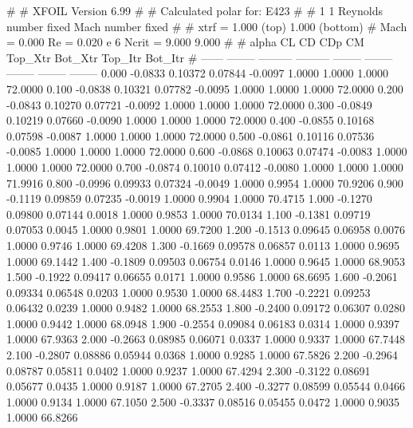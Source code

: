 #  
#       XFOIL         Version 6.99
#  
# Calculated polar for: E423                                            
#  
# 1 1 Reynolds number fixed          Mach number fixed         
#  
# xtrf =   1.000 (top)        1.000 (bottom)  
# Mach =   0.000     Re =     0.020 e 6     Ncrit =   9.000  9.000
#  
#   alpha    CL        CD       CDp       CM     Top_Xtr  Bot_Xtr  Top_Itr  Bot_Itr
#  ------ -------- --------- --------- -------- -------- -------- -------- --------
   0.000  -0.0833   0.10372   0.07844  -0.0097   1.0000   1.0000   1.0000  72.0000
   0.100  -0.0838   0.10321   0.07782  -0.0095   1.0000   1.0000   1.0000  72.0000
   0.200  -0.0843   0.10270   0.07721  -0.0092   1.0000   1.0000   1.0000  72.0000
   0.300  -0.0849   0.10219   0.07660  -0.0090   1.0000   1.0000   1.0000  72.0000
   0.400  -0.0855   0.10168   0.07598  -0.0087   1.0000   1.0000   1.0000  72.0000
   0.500  -0.0861   0.10116   0.07536  -0.0085   1.0000   1.0000   1.0000  72.0000
   0.600  -0.0868   0.10063   0.07474  -0.0083   1.0000   1.0000   1.0000  72.0000
   0.700  -0.0874   0.10010   0.07412  -0.0080   1.0000   1.0000   1.0000  71.9916
   0.800  -0.0996   0.09933   0.07324  -0.0049   1.0000   0.9954   1.0000  70.9206
   0.900  -0.1119   0.09859   0.07235  -0.0019   1.0000   0.9904   1.0000  70.4715
   1.000  -0.1270   0.09800   0.07144   0.0018   1.0000   0.9853   1.0000  70.0134
   1.100  -0.1381   0.09719   0.07053   0.0045   1.0000   0.9801   1.0000  69.7200
   1.200  -0.1513   0.09645   0.06958   0.0076   1.0000   0.9746   1.0000  69.4208
   1.300  -0.1669   0.09578   0.06857   0.0113   1.0000   0.9695   1.0000  69.1442
   1.400  -0.1809   0.09503   0.06754   0.0146   1.0000   0.9645   1.0000  68.9053
   1.500  -0.1922   0.09417   0.06655   0.0171   1.0000   0.9586   1.0000  68.6695
   1.600  -0.2061   0.09334   0.06548   0.0203   1.0000   0.9530   1.0000  68.4483
   1.700  -0.2221   0.09253   0.06432   0.0239   1.0000   0.9482   1.0000  68.2553
   1.800  -0.2400   0.09172   0.06307   0.0280   1.0000   0.9442   1.0000  68.0948
   1.900  -0.2554   0.09084   0.06183   0.0314   1.0000   0.9397   1.0000  67.9363
   2.000  -0.2663   0.08985   0.06071   0.0337   1.0000   0.9337   1.0000  67.7448
   2.100  -0.2807   0.08886   0.05944   0.0368   1.0000   0.9285   1.0000  67.5826
   2.200  -0.2964   0.08787   0.05811   0.0402   1.0000   0.9237   1.0000  67.4294
   2.300  -0.3122   0.08691   0.05677   0.0435   1.0000   0.9187   1.0000  67.2705
   2.400  -0.3277   0.08599   0.05544   0.0466   1.0000   0.9134   1.0000  67.1050
   2.500  -0.3337   0.08516   0.05455   0.0472   1.0000   0.9035   1.0000  66.8266
